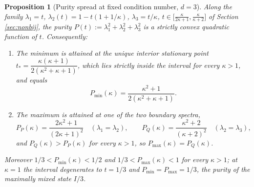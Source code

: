 \documentclass{article}
\newtheorem{proposition}[theorem]{Proposition}
\theoremstyle{remark}
\begin{document}
\begin{proposition}[Purity spread at fixed condition number, $d=3$]\label{prop:purity-spread}
Along the family $\lambda_1=t$, $\lambda_2(t)=1-t(1+1/\kappa)$, $\lambda_3=t/\kappa$, $t\in\big[\tfrac{\kappa}{2\kappa+1},\tfrac{\kappa}{\kappa+2}\big]$ of Section \ref{sec:nonbij}, the purity $P(t):=\lambda_1^2+\lambda_2^2+\lambda_3^2$ is a strictly convex quadratic function of $t$. Consequently:
\begin{enumerate}[label=(\alph*)]
\item The minimum is attained at the unique interior stationary point $t_*=\dfrac{\kappa(\kappa+1)}{2(\kappa^2+\kappa+1)}$, which lies strictly inside the interval for every $\kappa>1$, and equals
\[
P_{\min}(\kappa) = \frac{\kappa^2+1}{2(\kappa^2+\kappa+1)}.
\]
\item The maximum is attained at one of the two boundary spectra,
\[
P_P(\kappa) = \frac{2\kappa^2+1}{(2\kappa+1)^2} \quad(\lambda_1=\lambda_2), \qquad
P_Q(\kappa) = \frac{\kappa^2+2}{(\kappa+2)^2} \quad(\lambda_2=\lambda_3),
\]
and $P_Q(\kappa) > P_P(\kappa)$ for every $\kappa>1$, so $P_{\max}(\kappa)=P_Q(\kappa)$.
\end{enumerate}
Moreover $1/3 < P_{\min}(\kappa) < 1/2$ and $1/3 < P_{\max}(\kappa) < 1$ for every $\kappa>1$; at $\kappa=1$ the interval degenerates to $t=1/3$ and $P_{\min}=P_{\max}=1/3$, the purity of the maximally mixed state $I/3$.
\end{proposition}
\end{document}
